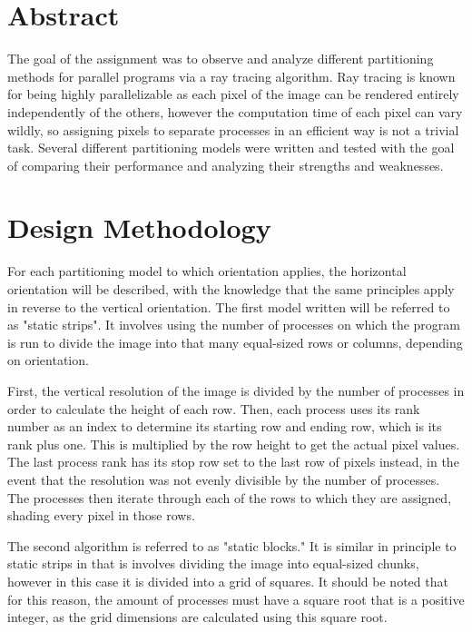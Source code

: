 \documentclass[CMPE]{KGCOEReport}
\begin{document}
\maketitle

\setlength{\parskip}{1cm}

\section*{Abstract}

The goal of the assignment was to observe and analyze different partitioning methods 
for parallel programs via a ray tracing algorithm. Ray tracing is known for being highly 
parallelizable as each pixel of the image can be rendered entirely independently of 
the others, however the computation time of each pixel can vary wildly, so assigning 
pixels to separate processes in an efficient way is not a trivial task. Several different 
partitioning models were written and tested with the goal of comparing their performance 
and analyzing their strengths and weaknesses.

\section*{Design Methodology}

For each partitioning model to which orientation applies, the horizontal orientation 
will be described, with the knowledge that the same principles apply in reverse to the 
vertical orientation. The first model written will be referred to as "static strips". 
It involves using the number of processes on which the program is run to divide the 
image into that many equal-sized rows or columns, depending on orientation.

First, the vertical resolution of the image is divided by the number of processes in 
order to calculate the height of each row. Then, each process uses its rank number as 
an index to determine its starting row and ending row, which is its rank plus one. This 
is multiplied by the row height to get the actual pixel values. The last process rank 
has its stop row set to the last row of pixels instead, in the event that the resolution 
was not evenly divisible by the number of processes. The processes then iterate through 
each of the rows to which they are assigned, shading every pixel in those rows.

The second algorithm is referred to as "static blocks." It is similar in principle to 
static strips in that is involves dividing the image into equal-sized chunks, however 
in this case it is divided into a grid of squares. It should be noted that for this reason, 
the amount of processes must have a square root that is a positive integer, as the grid 
dimensions are calculated using this square root.
\end{document}
